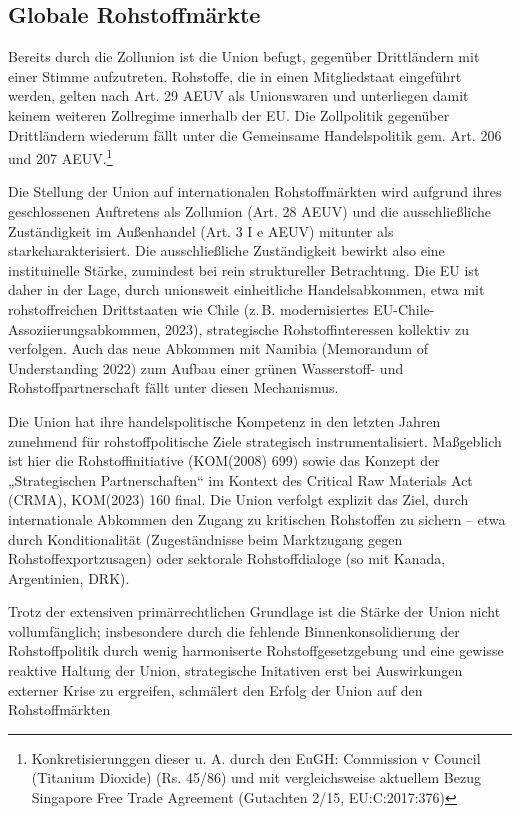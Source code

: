\documentclass[12pt,a4paper,oneside]{book} %
\begin{document}
\subsection{Globale Rohstoffmärkte}

Bereits durch die Zollunion ist die Union befugt, gegenüber Drittländern mit einer Stimme aufzutreten. Rohstoffe, die in einen Mitgliedstaat eingeführt werden, gelten nach Art. 29 AEUV als Unionswaren und unterliegen damit keinem weiteren Zollregime innerhalb der EU. Die Zollpolitik gegenüber Drittländern wiederum fällt unter die Gemeinsame Handelspolitik gem. Art. 206 und 207 AEUV.\footnote{Konkretisierunggen dieser u. A. durch den EuGH: Commission v Council (Titanium Dioxide) (Rs. 45/86) und mit vergleichsweise aktuellem Bezug Singapore Free Trade Agreement (Gutachten 2/15, EU:C:2017:376)}

Die Stellung der Union auf internationalen Rohstoffmärkten wird aufgrund ihres geschlossenen Auftretens als Zollunion (Art. 28 AEUV) und die ausschließliche Zuständigkeit im Außenhandel (Art. 3 I e AEUV) mitunter als \glqq stark\grqq charakterisiert.\autocite{Schorkopf, Rohstoffverwaltung, Rn. 34.} Die ausschließliche Zuständigkeit bewirkt also eine instituinelle Stärke, zumindest bei rein struktureller Betrachtung. Die EU ist daher in der Lage, durch unionsweit einheitliche Handelsabkommen, etwa mit rohstoffreichen Drittstaaten wie Chile (z. B. modernisiertes EU-Chile-Assoziierungsabkommen, 2023), strategische Rohstoffinteressen kollektiv zu verfolgen. Auch das neue Abkommen mit Namibia (Memorandum of Understanding 2022) zum Aufbau einer grünen Wasserstoff- und Rohstoffpartnerschaft fällt unter diesen Mechanismus.

Die Union hat ihre handelspolitische Kompetenz in den letzten Jahren zunehmend für rohstoffpolitische Ziele strategisch instrumentalisiert. Maßgeblich ist hier die Rohstoffinitiative (KOM(2008) 699) sowie das Konzept der „Strategischen Partnerschaften“ im Kontext des Critical Raw Materials Act (CRMA), KOM(2023) 160 final. Die Union verfolgt explizit das Ziel, durch internationale Abkommen den Zugang zu kritischen Rohstoffen zu sichern -- etwa durch Konditionalität (Zugeständnisse beim Marktzugang gegen Rohstoffexportzusagen) oder sektorale Rohstoffdialoge (so mit Kanada, Argentinien, DRK).

Trotz der extensiven primärrechtlichen Grundlage ist die Stärke der Union nicht vollumfänglich; insbesondere durch die fehlende Binnenkonsolidierung der Rohstoffpolitik durch wenig harmoniserte Rohstoffgesetzgebung und eine gewisse reaktive Haltung der Union, strategische Initativen erst bei Auswirkungen externer Krise zu ergreifen, schmälert den Erfolg der Union auf den Rohstoffmärkten
\end{document}
